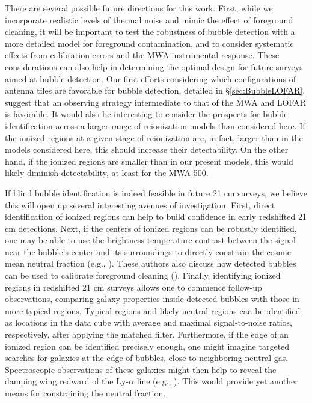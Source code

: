 There are several possible future directions for this work. First, while we incorporate realistic levels
of thermal noise and mimic the effect of foreground cleaning, it will be important to
test the robustness of bubble detection with a more detailed model for foreground contamination,
and to consider systematic effects from calibration errors and the MWA instrumental response.
These considerations can also help in determining the optimal design for future surveys aimed at
bubble detection. Our first efforts considering which configurations of antenna tiles are favorable for bubble
detection, detailed in \S \ref{sec:BubbleLOFAR}, suggest that an observing strategy
intermediate to that of the MWA and LOFAR is favorable. It would also be interesting to
consider the prospects for bubble identification across a larger range of reionization models
than considered here. If the ionized regions at a given stage of reionization are, in fact, larger 
than in the models considered here, this should increase their detectability. On the
other hand, if the ionized regions are smaller than in our present models, this would likely
diminish detectability, at least for the MWA-500.

If blind bubble identification is indeed feasible in future 21 cm surveys, we believe
this will open up several interesting avenues of investigation. First, direct identification
of ionized regions can help to build confidence in early redshifted 21 cm detections.
Next, if the centers of ionized regions can be robustly identified, one may be able
to use the brightness temperature contrast between the signal near the bubble's center and its surroundings
to directly constrain the cosmic mean neutral fraction (e.g., \citealt{Petrovic:2010me}).
These authors also discuss how detected bubbles can be used to calibrate foreground
cleaning (\citealt{Petrovic:2010me}). Finally, identifying ionized regions in
redshifted 21 cm surveys allows one to commence follow-up observations, comparing galaxy properties inside detected bubbles
with those in more typical regions. Typical regions and likely neutral
regions can be identified as locations in the data cube with average and maximal signal-to-noise ratios, respectively, after
applying the matched filter.
Furthermore, if the edge of an ionized region can be identified
precisely enough, one might imagine targeted searches for galaxies at the edge of bubbles, close to neighboring neutral gas.
Spectroscopic
observations of these galaxies might then help to reveal 
the damping wing redward of the Ly-$\alpha$ line (e.g., \citealt{MiraldaEscude:1997qb}).
This would provide yet another means for
constraining the neutral fraction.















